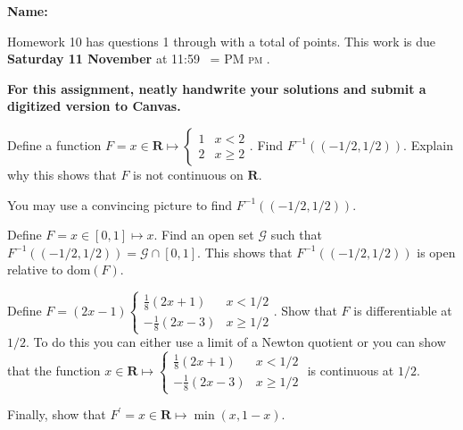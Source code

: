 \documentclass[12pt,fleqn,answers]{exam}
\makeatletter
\newcommand{\reals}{\mathbf{R}}
\newcommand{\dom}{\mbox{dom}}
\newcommand{\quiz}{10}
\newcommand{\term}{Fall}
\DeclareRobustCommand{\maybefakesc}[1]{%
  \ifnum\pdfstrcmp{\f@series}{\bfdefault}=\z@
    {\fontsize{\dimexpr0.8\dimexpr\f@size pt\relax}{0}\selectfont\uppercase{#1}}%
  \else
    \textsc{#1}%
  \fi
}
\newcommand\PM{\,\maybefakesc{pm}\xspace}
\makeatother
\begin{document}
\large
\vspace{0.1in}
\noindent{}
{\bf Name:}  \\
\noindent \makebox[3.0truein][l]{\textbf{Homework \quiz, \term \/ \the\year}}
\vspace{0.1in}

\noindent  Homework \quiz\/  has questions 1 through  \numquestions \/ with a total 
of  \numpoints\/  points. 
This work is due \textbf{Saturday 11 November} at 11:59 \PM.

\textbf{For this assignment, neatly handwrite your solutions and submit
a digitized version to Canvas.}

\vspace{0.1in}


\begin{questions}

 
    \question[10] Define a function $F = x \in \reals \mapsto \begin{cases}
        1 & x < 2 \\ 2 & x \geq 2 \end{cases}$.  Find $F^{-1} \left(\left(-1/2, 1/2\right) \right)$.
        Explain why this shows that $F$ is not continuous on $\reals$.

        You may use a convincing picture to find $F^{-1} \left(\left(-1/2, 1/2\right) \right)$.

        \question[10] Define $F = x \in [0,1] \mapsto x$. Find an open set $\mathcal{G}$
        such that $F^{-1}\left(\left(-1/2,1/2\right)\right) = \mathcal{G} \cap [0,1]$.
        This shows that $F^{-1}\left(\left(-1/2,1/2\right)\right)$ is open relative to 
        $\dom(F)$.

        \question[10] Define $F = (2x -1) \begin{cases}  \frac{1}{8} (2x+1) & x < 1/2 \\
        -\frac{1}{8} (2x - 3) & x \geq 1/2 \end{cases}$. Show that 
        $F$ is differentiable at $1/2$. To do this you can either
        use a limit of a Newton quotient or you can show that the
        function $x \in \reals \mapsto \begin{cases}  \frac{1}{8} (2x+1) & x < 1/2 \\
            -\frac{1}{8} (2x - 3) & x \geq 1/2 \end{cases}$ is
            continuous at $1/2$.
        
        Finally, show that 
        $
         F^\prime = x \in \reals \mapsto \min(x,1-x).
        $
        




\end{questions}
\end{document}
